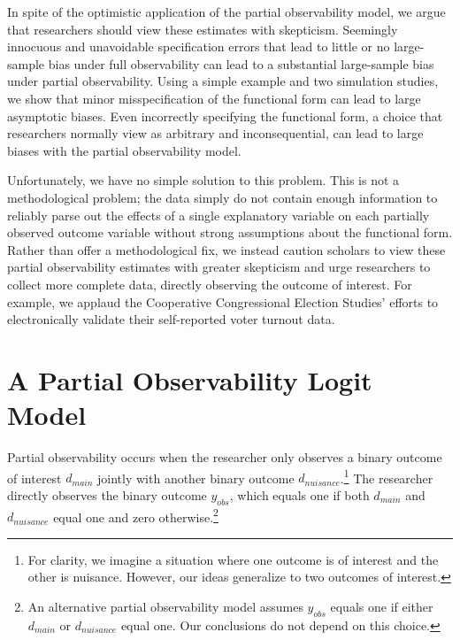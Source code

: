\documentclass[10pt]{article}
\begin{document}
In spite of the optimistic application of the partial observability model, we argue that researchers should view these estimates with skepticism. Seemingly innocuous and unavoidable specification errors that lead to little or no large-sample bias under full observability can lead to a substantial large-sample bias under partial observability. Using a simple example and two simulation studies, we show that minor misspecification of the functional form can lead to large asymptotic biases. Even incorrectly specifying the functional form, a choice that researchers normally view as arbitrary and inconsequential, can lead to large biases with the partial observability model. 

Unfortunately, we have no simple solution to this problem. This is not a methodological problem; the data simply do not contain enough information to reliably parse out the effects of a single explanatory variable on each partially observed outcome variable without strong assumptions about the functional form. Rather than offer a methodological fix, we instead caution scholars to view these partial observability estimates with greater skepticism and urge researchers to collect more complete data, directly observing the outcome of interest. For example, we applaud the Cooperative Congressional Election Studies' efforts to electronically validate their self-reported voter turnout data.


\section*{A Partial Observability Logit Model}

Partial observability occurs when the researcher only observes a binary outcome of interest $d_{main}$ jointly with another binary outcome $d_{nuisance}$.\footnote{For clarity, we imagine a situation where one outcome is of interest and the other is nuisance. 
However, our ideas generalize to two outcomes of interest.}
The researcher directly observes the binary outcome $y_{obs}$, which equals one if both $d_{main}$ and $d_{nuisance}$ equal one and zero otherwise.\footnote{An alternative partial observability model assumes $y_{obs}$ equals one if either $d_{main}$ or $d_{nuisance}$ equal one. 
Our conclusions do not depend on this choice.}
\end{document}
